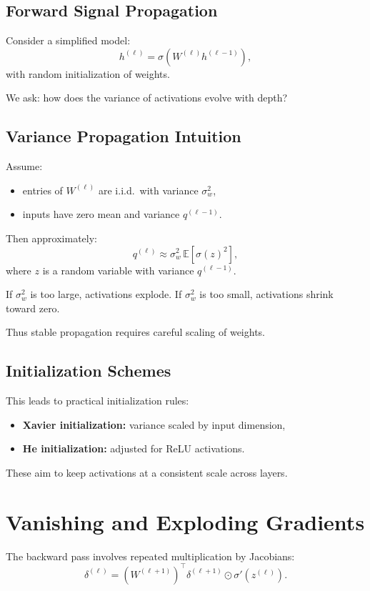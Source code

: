 \subsection{Forward Signal Propagation}

Consider a simplified model:
\[
h^{(\ell)} = \sigma(W^{(\ell)} h^{(\ell-1)}),
\]
with random initialization of weights.

We ask: how does the variance of activations evolve with depth?

\subsection{Variance Propagation Intuition}

Assume:
\begin{itemize}
    \item entries of $W^{(\ell)}$ are i.i.d.\ with variance $\sigma_w^2$,
    \item inputs have zero mean and variance $q^{(\ell-1)}$.
\end{itemize}

Then approximately:
\[
q^{(\ell)} \approx \sigma_w^2 \, \mathbb{E}[\sigma(z)^2],
\]
where $z$ is a random variable with variance $q^{(\ell-1)}$.

If $\sigma_w^2$ is too large, activations explode.  
If $\sigma_w^2$ is too small, activations shrink toward zero.

Thus stable propagation requires careful scaling of weights.

\subsection{Initialization Schemes}

This leads to practical initialization rules:
\begin{itemize}
    \item \textbf{Xavier initialization:} variance scaled by input dimension,
    \item \textbf{He initialization:} adjusted for ReLU activations.
\end{itemize}

These aim to keep activations at a consistent scale across layers.

\section{Vanishing and Exploding Gradients}

The backward pass involves repeated multiplication by Jacobians:
\[
\delta^{(\ell)} = (W^{(\ell+1)})^\top \delta^{(\ell+1)} \odot \sigma'(z^{(\ell)}).
\]

